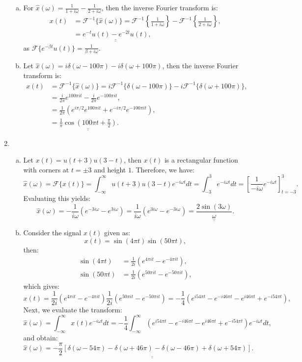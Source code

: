 \begin{enumerate}
\begin{enumerate}[a)]
\item For $\hat{x}(\omega)=\frac{1}{1+i\omega}-\frac{1}{2+i\omega}$, then the inverse Fourier transform is:
\begin{align*}
    x(t)&=\mathcal{F}^{-1}\{\hat{x}(\omega)\}=\mathcal{F}^{-1}\left\{\frac{1}{1+i\omega}\right\}-\mathcal{F}^{-1}\left\{\frac{1}{2+i\omega}\right\}, \\
    &=\underline{\underline{e^{-t}u(t)-e^{-2t}u(t)}},
\end{align*}
as $\mathcal{F}\{e^{-\beta t}u(t)\}=\frac{1}{\beta+i\omega}$. 

\item Let $\hat{x}(\omega)=i\delta(\omega-100\pi)-i\delta(\omega+100\pi)$, then the inverse Fourier transform is:
\begin{align*}
    x(t)&=\mathcal{F}^{-1}\{\hat{x}(\omega)\}=i\mathcal{F}^{-1}\{\delta(\omega-100\pi)\}-i\mathcal{F}^{-1}\{\delta(\omega+100\pi)\}, \\
    &=\frac{i}{2\pi}e^{100\pi it}-\frac{i}{2\pi}e^{-100\pi it}, \\
    &=\frac{1}{2\pi}(e^{i\pi/2}e^{100\pi i t}+e^{-i\pi/2}e^{-100\pi i t}), \\
    &=\underline{\underline{\frac{1}{\pi}\cos\left(100\pi t+\frac{\pi}{2}\right)}}.
\end{align*}
\end{enumerate}

\item   
\begin{enumerate}[a)]
\item Let $x(t)=u(t+3)u(3-t)$, then $x(t)$ is a rectangular function with corners at $t=\pm 3$ and height $1$. Therefore, we have:
$$\hat{x}(\omega)=\mathcal{F}\{x(t)\}=\int_{-\infty}^{\infty}u(t+3)u(3-t)e^{-i\omega t}dt=\int_{-3}^{3}e^{-i\omega t}dt=\left[\frac{1}{-i\omega}e^{-i\omega t}\right]_{t=-3}^{3}.$$
Evaluating this yields:
$$\hat{x}(\omega)=-\frac{1}{i\omega}(e^{-3i\omega}-e^{3i\omega})=\frac{1}{i\omega}(e^{3i\omega}-e^{-3i\omega})=\underline{\underline{\frac{2\sin(3\omega)}{\omega}}}.$$

\item Consider the signal $x(t)$ given as:
$$x(t)=\sin(4\pi t)\sin(50\pi t),$$
then:
\begin{align*}
    \sin(4\pi t)&=\frac{1}{2i}(e^{4\pi i t}-e^{-4\pi it}), \\
    \sin(50\pi t)&=\frac{1}{2i}(e^{50\pi it}-e^{-50\pi it}),
\end{align*}
which gives:
$$x(t)=\frac{1}{2i}\left(e^{4\pi it}-e^{-4\pi it}\right)\frac{1}{2i}\left(e^{50\pi it}-e^{-50\pi it}\right)=-\frac{1}{4}\left(e^{i54\pi t}-e^{-i46\pi t}-e^{i46\pi t}+e^{-i54\pi t}\right),$$
Next, we evaluate the transform:
$$\hat{x}(\omega)=\int_{-\infty}^{\infty}x(t)e^{-i\omega t}dt=-\frac{1}{4}\int_{-\infty}^{\infty}\left(e^{i54\pi t}-e^{-i46\pi t}-e^{i46\pi t}+e^{-i54\pi t}\right)e^{-i\omega t}dt,$$
and obtain:
$$\hat{x}(\omega)=\underline{\underline{-\frac{\pi}{2}[\delta(\omega-54\pi)-\delta(\omega+46\pi)-\delta(\omega-46\pi)+\delta(\omega+54\pi)]}}.$$


\end{enumerate}
\end{enumerate}
